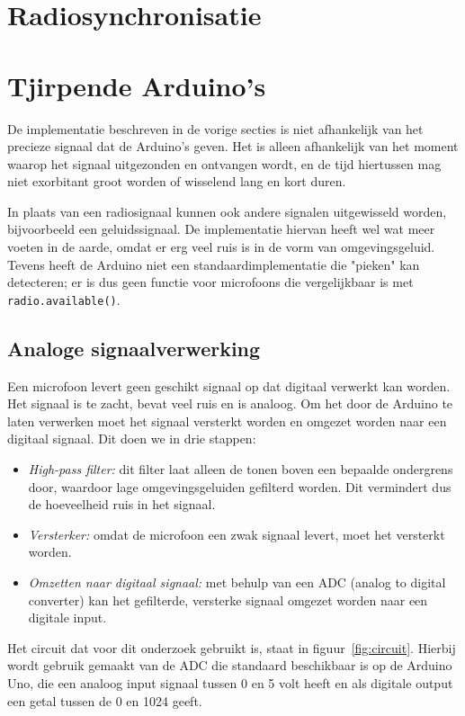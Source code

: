 \documentclass[a4paper,10pt]{article}
\begin{document}
\section{Radiosynchronisatie}\label{sec:radiosync}

\section{Tjirpende Arduino's}\label{sec:geluidssec}
De implementatie beschreven in de vorige secties is niet afhankelijk van het precieze signaal dat de Arduino's geven. Het is alleen afhankelijk van het moment waarop het signaal uitgezonden en ontvangen wordt, en de tijd hiertussen mag niet exorbitant groot worden of wisselend lang en kort duren.

In plaats van een radiosignaal kunnen ook andere signalen uitgewisseld worden, bijvoorbeeld een geluidssignaal. De implementatie hiervan heeft wel wat meer voeten in de aarde, omdat er erg veel ruis is in de vorm van omgevingsgeluid. Tevens heeft de Arduino niet een standaardimplementatie die "pieken" kan detecteren; er is dus geen functie voor microfoons die vergelijkbaar is met \texttt{radio.available()}.

\subsection{Analoge signaalverwerking}
Een microfoon levert geen geschikt signaal op dat digitaal verwerkt kan worden. Het signaal is te zacht, bevat veel ruis en is analoog. Om het door de Arduino te laten verwerken moet het signaal versterkt worden en omgezet worden naar een digitaal signaal. Dit doen we in drie stappen:

\begin{itemize}
	\item \textit{High-pass filter:} dit filter laat alleen de tonen boven een bepaalde ondergrens door, waardoor lage omgevingsgeluiden gefilterd worden. Dit vermindert dus de hoeveelheid ruis in het signaal.
	\item \textit{Versterker:} omdat de microfoon een zwak signaal levert, moet het versterkt worden.
	\item \textit{Omzetten naar digitaal signaal:} met behulp van een ADC (analog to digital converter) kan het gefilterde, versterke signaal omgezet worden naar een digitale input.
\end{itemize}

Het circuit dat voor dit onderzoek gebruikt is, staat in figuur~\ref{fig:circuit}. Hierbij wordt gebruik gemaakt van de ADC die standaard beschikbaar is op de Arduino Uno, die een analoog input signaal tussen 0 en 5 volt heeft en als digitale output een getal tussen de 0 en 1024 geeft.
\end{document}

